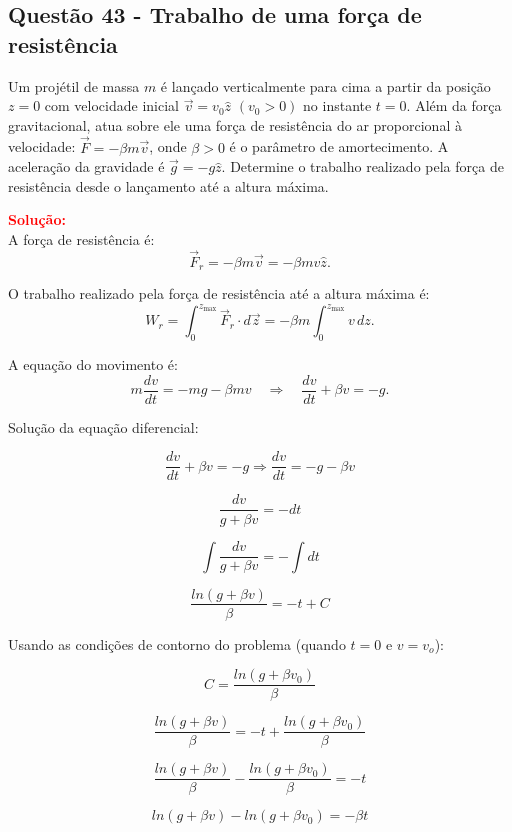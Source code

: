 \documentclass[a4paper,12pt]{article}
\begin{document}
\begin{flushleft}
\subsection{Quest\~ao 43 - Trabalho de uma força de resistência}
\noindent
Um projétil de massa $m$ é lançado verticalmente para cima a partir da posição $z=0$ com velocidade inicial 
$\vec{v} = v_0 \hat{z}$ $(v_0>0)$ no instante $t=0$. Além da força gravitacional, atua sobre ele uma força de 
resistência do ar proporcional à velocidade: $\vec{F} = - \beta m \vec{v}$, onde $\beta>0$ é o parâmetro de amortecimento. 
A aceleração da gravidade é $\vec{g} = - g \hat{z}$. Determine o trabalho realizado pela força de resistência desde o lançamento até a altura máxima.

\vspace{0.5cm}

\textcolor{red}{\textbf{Solução:}}\\

A força de resistência é:
\[
\vec{F}_r = - \beta m \vec{v} = - \beta m v \hat{z}.
\]

O trabalho realizado pela força de resistência até a altura máxima é:
\[
W_r = \int_{0}^{z_\text{max}} \vec{F}_r \cdot d\vec{z} = - \beta m \int_0^{z_\text{max}} v \, dz.
\]

A \colorbox{red!20}{equação do movimento é}:
\[
m \frac{dv}{dt} = - mg - \beta m v \quad \Rightarrow \quad \boxed{\frac{dv}{dt} + \beta v = - g.}
\]

Solução da equação diferencial:

\[
\frac{dv}{dt} + \beta v = - g \Rightarrow \frac{dv}{dt} = - g - \beta v 
\]

\[
\frac{dv}{g+ \beta v} = - dt
\]

\[
\int \frac{dv}{g+ \beta v} = - \int dt
\]

\[
\frac{ln \left( g+ \beta v \right)}{\beta} = - t + C
\]

Usando as \colorbox{green!30}{condi\c{c}\~oes de contorno do problema (quando $t=0$ e $v=v_{o}$)}:

\[C = \frac{ln \left( g+ \beta v_0 \right)}{\beta}\]

\[
\frac{ln \left( g+ \beta v \right)}{\beta} = - t + \frac{ln \left( g+ \beta v_0 \right)}{\beta}
\]

\[
\frac{ln \left( g+ \beta v \right)}{\beta} - \frac{ln \left( g+ \beta v_0 \right)}{\beta} = - t
\]

\[
ln \left( g+ \beta v \right) - ln \left( g+ \beta v_0 \right) = - \beta t
\]


\end{flushleft}
\end{document}
